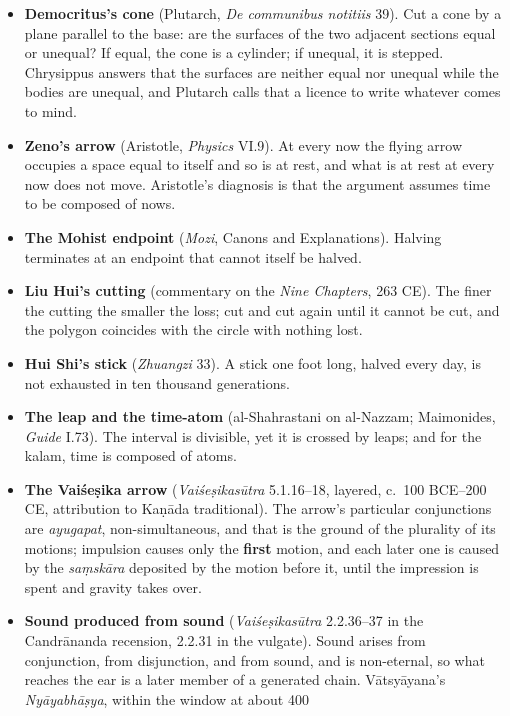 \documentclass[11pt,a4paper]{article}
\newcommand{\tightlist}{\setlength{\itemsep}{0pt}\setlength{\parskip}{0pt}}
\begin{document}
\begin{itemize}
\tightlist
\item
  \textbf{Democritus's cone} (Plutarch, \emph{De communibus notitiis}
  39). Cut a cone by a plane parallel to the base: are the surfaces of
  the two adjacent sections equal or unequal? If equal, the cone is a
  cylinder; if unequal, it is stepped. Chrysippus answers that the
  surfaces are neither equal nor unequal while the bodies are unequal,
  and Plutarch calls that a licence to write whatever comes to mind.
\item
  \textbf{Zeno's arrow} (Aristotle, \emph{Physics} VI.9). At every now
  the flying arrow occupies a space equal to itself and so is at rest,
  and what is at rest at every now does not move. Aristotle's diagnosis
  is that the argument assumes time to be composed of nows.
\item
  \textbf{The Mohist endpoint} (\emph{Mozi}, Canons and Explanations).
  Halving terminates at an endpoint that cannot itself be halved.
\item
  \textbf{Liu Hui's cutting} (commentary on the \emph{Nine Chapters},
  263 CE). The finer the cutting the smaller the loss; cut and cut again
  until it cannot be cut, and the polygon coincides with the circle with
  nothing lost.
\item
  \textbf{Hui Shi's stick} (\emph{Zhuangzi} 33). A stick one foot long,
  halved every day, is not exhausted in ten thousand generations.
\item
  \textbf{The leap and the time-atom} (al-Shahrastani on al-Nazzam;
  Maimonides, \emph{Guide} I.73). The interval is divisible, yet it is
  crossed by leaps; and for the kalam, time is composed of atoms.
\item
  \textbf{The Vaiśeṣika arrow} (\emph{Vaiśeṣikasūtra} 5.1.16--18,
  layered, c.~100 BCE--200 CE, attribution to Kaṇāda traditional). The
  arrow's particular conjunctions are \emph{ayugapat}, non-simultaneous,
  and that is the ground of the plurality of its motions; impulsion
  causes only the \textbf{first} motion, and each later one is caused by
  the \emph{saṃskāra} deposited by the motion before it, until the
  impression is spent and gravity takes over.
\item
  \textbf{Sound produced from sound} (\emph{Vaiśeṣikasūtra} 2.2.36--37
  in the Candrānanda recension, 2.2.31 in the vulgate). Sound arises
  from conjunction, from disjunction, and from sound, and is
  non-eternal, so what reaches the ear is a later member of a generated
  chain. Vātsyāyana's \emph{Nyāyabhāṣya}, within the window at about 400

\end{itemize}
\end{document}

